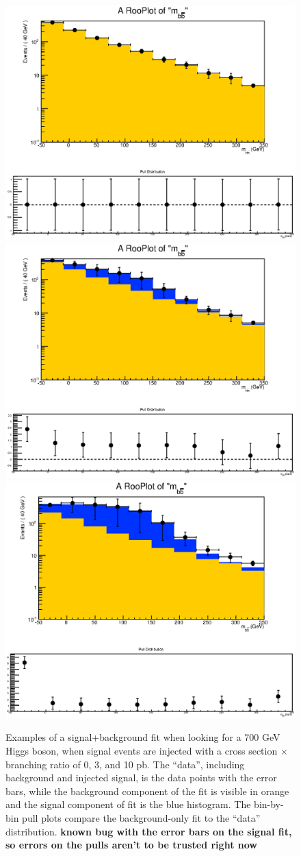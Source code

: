 \begin{figure}[hbt]
    \center
    \includegraphics[width=0.3\linewidth]{FitResults/images/fitData_bAbb_700_log_3jets_bbb_hipt_0sig.eps}
    \includegraphics[width=0.3\linewidth]{FitResults/images/fitData_bAbb_700_log_3jets_bbb_hipt_3sig.eps}
    \includegraphics[width=0.3\linewidth]{FitResults/images/fitData_bAbb_700_log_3jets_bbb_hipt_10sig.eps}
    \caption{Examples of a signal+background fit when looking for a 700 GeV Higgs boson,
    when signal events are injected with a cross section $\times$ branching ratio of 0, 3, and 10 pb.
    The ``data'', including background and injected signal, is the data points with the error bars,
    while the background component of the fit is visible in orange and the signal component of fit
    is the blue histogram.  The bin-by-bin pull plots compare the background-only fit to the ``data''
    distribution. \textbf{known bug with the error bars on the signal fit, so errors on the pulls aren't
    to be trusted right now}
    \label{fig:signal_injection_700}}
\end{figure}


